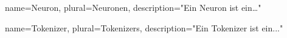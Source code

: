 \usepackage{glossaries}

\makeglossaries

{
name=Neuron,
plural=Neuronen,
description="Ein Neuron ist ein…"
}

{
name=Tokenizer,
plural=Tokenizers,
description="Ein Tokenizer ist ein..."
}